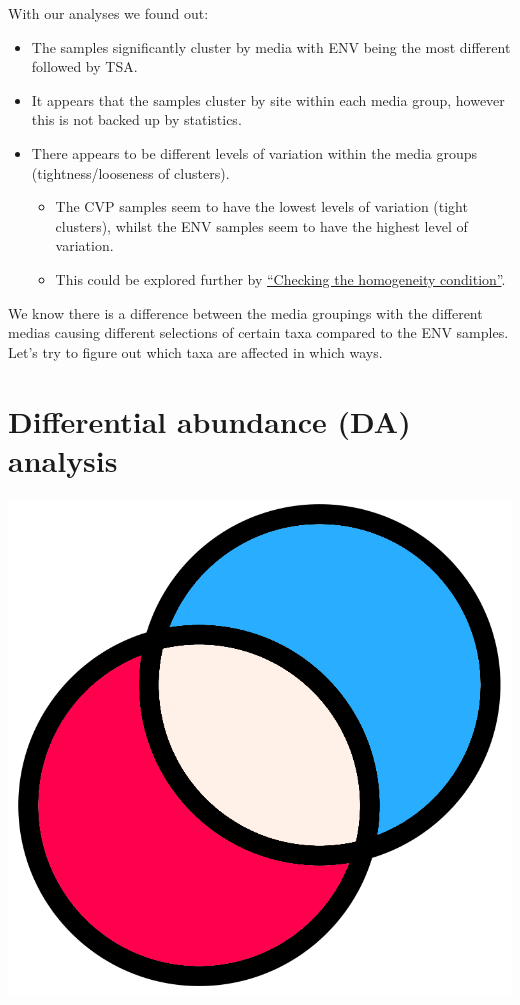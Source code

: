 \documentclass[
]{book}
\providecommand{\tightlist}{%
  \setlength{\itemsep}{0pt}\setlength{\parskip}{0pt}}
\begin{document}
With our analyses we found out:

\begin{itemize}
\tightlist
\item
  The samples significantly cluster by media with ENV being the most different followed by TSA.
\item
  It appears that the samples cluster by site within each media group, however this is not backed up by statistics.
\item
  There appears to be different levels of variation within the media groups (tightness/looseness of clusters).

  \begin{itemize}
  \tightlist
  \item
    The CVP samples seem to have the lowest levels of variation (tight clusters), whilst the ENV samples seem to have the highest level of variation.
  \item
    This could be explored further by \href{https://microbiome.github.io/tutorials/PERMANOVA.html}{``Checking the homogeneity condition''}.
  \end{itemize}
\end{itemize}

We know there is a difference between the media groupings with the different medias causing different selections of certain taxa compared to the ENV samples.
Let's try to figure out which taxa are affected in which ways.

\hypertarget{DA_chap}{%
\chapter{Differential abundance (DA) analysis}\label{DA_chap}}

\includegraphics{figures/difference.png}
\end{document}
